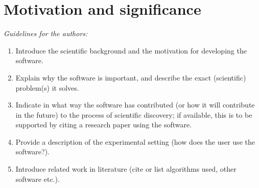 \documentclass[preprint,12pt, a4paper]{elsarticle}
\begin{document}
\section{Motivation and significance}\label{sec:motivation}

{\em Guidelines for the authors:
\begin{enumerate}
	\item Introduce the scientific background and the motivation for
		    developing the software.
  \item Explain why the software is important, and describe the exact
        (scientific) problem(s) it solves.
	\item Indicate in what way the software has contributed (or how it will
        contribute in the future) to the process of scientific discovery;
        if available, this is to be supported by citing a research paper
        using the software.
  \item Provide a description of the experimental setting (how does the 
        user use the software?).
  \item Introduce related work in literature (cite or list algorithms 
          used, other software etc.).
\end{enumerate}}
\end{document}
